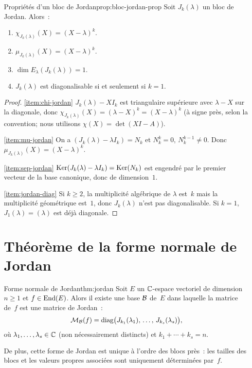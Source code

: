 \begin{proposition}{Propriétés d'un bloc de Jordan}{prop:bloc-jordan-prop}
  Soit $J_k(\lambda)$ un bloc de Jordan. Alors~:
  \begin{enumerate}[label=(\roman*)]
    \item\label{item:chi-jordan} $\chi_{J_k(\lambda)}(X)=(X-\lambda)^k$.
    \item\label{item:mu-jordan} $\mu_{J_k(\lambda)}(X)=(X-\lambda)^k$.
    \item\label{item:sep-jordan} $\dim E_\lambda(J_k(\lambda))=1$.
    \item\label{item:jordan-diag} $J_k(\lambda)$ est diagonalisable si
      et seulement si $k=1$.
  \end{enumerate}
\end{proposition}

\begin{proof}
  \ref{item:chi-jordan}
  $J_k(\lambda)-XI_k$ est triangulaire supérieure avec $\lambda-X$
  sur la diagonale, donc $\chi_{J_k(\lambda)}(X)=(\lambda-X)^k=(X-\lambda)^k$
  (à signe près, selon la convention; nous utilisons
  $\chi(X)=\det(XI-A)$).

  \ref{item:mu-jordan} On a $(J_k(\lambda)-\lambda I_k)=N_k$ et
  $N_k^k=0$, $N_k^{k-1}\neq 0$. Donc $\mu_{J_k(\lambda)}(X)=(X-\lambda)^k$.

  \ref{item:sep-jordan}
  $\operatorname{Ker}(J_k(\lambda)-\lambda I_k)=\operatorname{Ker}(N_k)$ est engendré par le premier
  vecteur de la base canonique, donc de dimension~$1$.

  \ref{item:jordan-diag} Si $k\geq 2$, la multiplicité algébrique de
  $\lambda$ est~$k$ mais la multiplicité géométrique est~$1$, donc
  $J_k(\lambda)$ n'est pas diagonalisable. Si $k=1$, $J_1(\lambda)=(\lambda)$
  est déjà diagonale.
\end{proof}


\section{Théorème de la forme normale de Jordan}\label{sec:theoreme-jordan}

\begin{theorem}{Forme normale de Jordan}{thm:jordan}
  Soit $E$ un ${\mathbb{C}}$-espace vectoriel de dimension $n\geq 1$ et
  $f\in\operatorname{End}(E)$. Alors il existe
  une base ${\mathcal{B}}$ de~$E$ dans laquelle la matrice de~$f$ est une matrice
  de Jordan~:
  \[
    \mathcal{M}_{\mathcal{B}}(f)=\operatorname{diag}\bigl(J_{k_1}(\lambda_1),\,\ldots,\,
    J_{k_s}(\lambda_s)\bigr),
  \]
  où $\lambda_1,\ldots,\lambda_s\in{\mathbb{C}}$ (non nécessairement distincts) et
  $k_1+\cdots+k_s=n$.

  De plus, cette forme de Jordan est unique à l'ordre des blocs près~:
  les tailles des blocs et les valeurs propres associées sont uniquement
  déterminées par~$f$.
\end{theorem}

